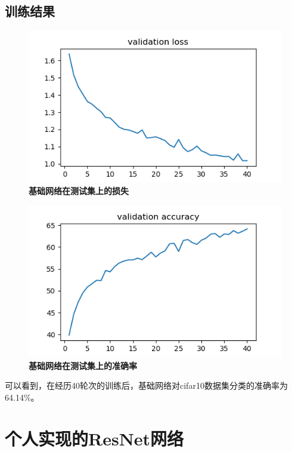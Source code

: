 \documentclass{article}
\begin{document}
\subsection{训练结果}
\begin{figure}[H]
   \centering
   \includegraphics{base_validation_loss.png}
   \caption{\textbf{基础网络在测试集上的损失}}
\end{figure}
\begin{figure}[H]
   \centering
   \includegraphics{base_validation_accuracy.png}
   \caption{\textbf{基础网络在测试集上的准确率}}
\end{figure}
可以看到，在经历40轮次的训练后，基础网络对cifar10数据集分类的准确率为64.14\%。

\section{个人实现的ResNet网络}
\end{document}
